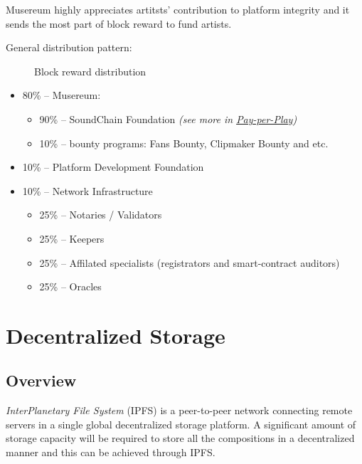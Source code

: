 \documentclass[12pt]{report}
\newcommand{\hlc}[1]{\colorbox{white!25}{#1}}
\begin{document}
Musereum highly appreciates artitsts' contribution to platform integrity and it sends the most part of block reward to fund artists.

General distribution pattern:

\def\Musereum{Musereum}
\def\Development{Platform Development}
\def\Infrastructure{Infrastructure}

\begin{figure}[H]
\centering
\caption{Block reward distribution}
\vspace{20pt}
\end{figure}

\begin{itemize}
	\item 80\% – Musereum:
	\begin{itemize}
		\item 90\% – SoundChain Foundation \textit{(see more in \hyperref[tech-apps-soundchain-payperplay]{Pay-per-Play})}
		\item 10\% – bounty programs: Fans Bounty, Clipmaker Bounty and etc.
	\end{itemize}
	\item 10\% – Platform Development Foundation
	\item 10\% – \hlc{Network Infrastructure}
	\begin{itemize}
		\item 25\% – Notaries / Validators
		\item 25\% – \hlc{Keepers}
		\item 25\% – Affilated specialists (\hlc{registrators} and smart-contract auditors)
		\item 25\% – Oracles
	\end{itemize}
\end{itemize}

\section{Decentralized Storage}
\label{tech-storage}
\subsection{Overview}
\label{tech-storage-review}
\textit{InterPlanetary File System} (IPFS) is a peer-to-peer network connecting remote servers in a single global decentralized storage platform. A significant amount of storage capacity will be required to store all the compositions in a decentralized manner and this can be achieved through IPFS.
\end{document}
